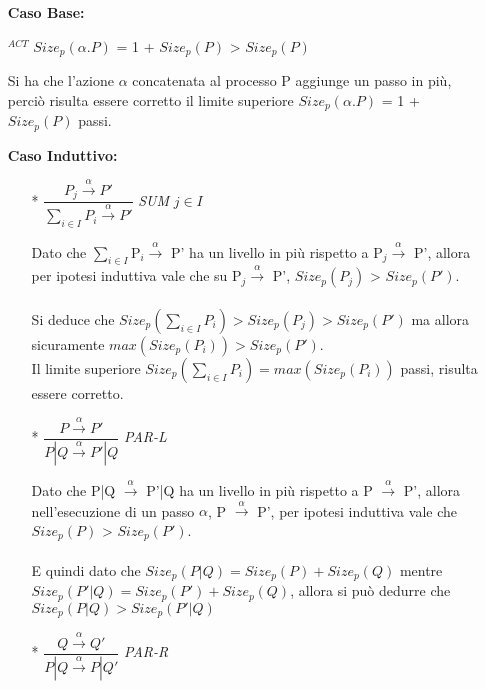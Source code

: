 \begin{itemize}
	\item[] \textbf{Caso Base:} \mbox{}
	
	
	$^{ACT}$ \hspace{1cm} $Size_{p}(\alpha.P)$ = 1 + $Size_{p}(P)$ > $Size_{p}(P)$
	
	Si ha che l'azione $\alpha$ concatenata al processo P aggiunge un passo in più, perciò risulta essere corretto il limite superiore $Size_{p}(\alpha.P)$ = 1 + $Size_{p}(P)$ passi.
	\\
	\item[] \textbf{Caso Induttivo:} \mbox{}
	\\
	\begin{itemize}
		
		\item[*]
			$\dfrac{P_{j} \overset{\alpha}\rightarrow P'}{\displaystyle\sum_{i\in I}^{}P_{i} \overset{\alpha}\rightarrow P'}$ \textit{SUM} $j\in I$                         
		
		Dato che $\displaystyle\sum_{i\in I}^{}$P$_{i} \overset{\alpha}\rightarrow$ P' ha un livello in più rispetto a P$_{j} \overset{\alpha}\rightarrow$ P', allora per ipotesi induttiva vale che su P$_{j} \overset{\alpha}\rightarrow$ P', $Size_{p}(P_{j})$ > $Size_{p}(P')$. \\
		\\
		Si deduce che $Size_{p}(\displaystyle\sum_{i\in I}^{}P_{i}) > Size_{p}(P_{j}) > Size_{p}(P') $ ma allora sicuramente $ max(Size_{p}(P_{i})) > Size_{p}(P')$.\\
		Il limite superiore $ Size_{p}(\displaystyle\sum_{i\in I}^{}P_{i}) = max(Size_{p}(P_{i}))$ passi, risulta essere corretto.
		\\
		\item[*]
				$\dfrac{P \overset{\alpha}\rightarrow P'}{P|Q \overset{\alpha}\rightarrow P'|Q}$ \textit{PAR-L}  
				
				Dato che P|Q $\overset{\alpha}\rightarrow$ P'|Q ha un livello in più rispetto a P $\overset{\alpha}\rightarrow$ P', allora nell'esecuzione di un passo $\alpha$, P $\overset{\alpha}\rightarrow$ P', per ipotesi induttiva vale che $Size_{p}(P)$ > $Size_{p}(P')$. \\
				\\
				E quindi dato che $Size_{p}(P|Q) = Size_{p}(P) + Size_{p}(Q)$ mentre $  Size_{p}(P'|Q) = Size_{p}(P') + Size_{p}(Q)$, allora si può dedurre che $Size_{p}(P|Q) > Size_{p}(P'|Q) $
				\\
		\item[*]
			$\dfrac{Q \overset{\alpha}\rightarrow Q'}{P|Q \overset{\alpha}\rightarrow P|Q'}$ \textit{PAR-R}  
			

\end{itemize}
\end{itemize}

